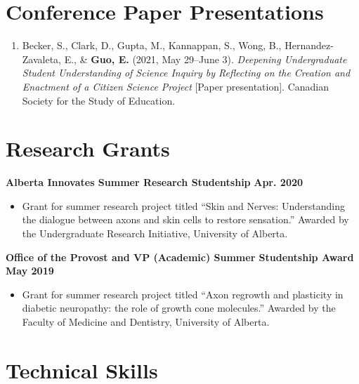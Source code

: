 \documentclass{article}
\begin{document}
\section*{\textcolor{my_colour}{Conference Paper Presentations}}
\vspace{-.25em} \hrulefill \vspace{.75em}
\vspace{-.5em}
\begin{enumerate}[leftmargin=!, itemindent=-.55cm]
    \item Becker, S., Clark, D., Gupta, M., Kannappan, S., Wong, B., Hernandez-Zavaleta, E., \& \textbf{Guo, E.} (2021, May 29--June 3). \textit{Deepening Undergraduate Student Understanding of Science Inquiry by Reflecting on the Creation and Enactment of a Citizen Science Project} [Paper presentation]. Canadian Society for the Study of Education.
\end{enumerate}


\section*{\textcolor{my_colour}{Research Grants}}
\vspace{-.25em} \hrulefill \vspace{.75em}

\textbf{Alberta Innovates Summer Research Studentship} \hfill \textbf{Apr. 2020}
\begin{itemize}
    \item Grant for summer research project titled ``Skin and Nerves: Understanding the dialogue between axons and skin cells to restore sensation.'' Awarded by the Undergraduate Research Initiative, University of Alberta.
\end{itemize}
\textbf{Office of the Provost and VP (Academic) Summer Studentship Award} \hfill \textbf{May 2019}
    \begin{itemize}
        \item Grant for summer research project titled ``Axon regrowth and plasticity in diabetic neuropathy: the role of growth cone molecules.'' Awarded by the Faculty of Medicine and Dentistry, University of Alberta.
    \end{itemize}


\section*{\textcolor{my_colour}{Technical Skills}}
\vspace{-.25em} \hrulefill \vspace{.75em}
\end{document}
